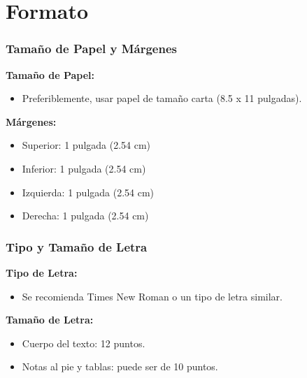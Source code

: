 \documentclass[
11pt, %
]{beamer}
\begin{document}
\section{Formato}

\begin{frame}
	\frametitle{Tamaño de Papel y Márgenes}

	\textbf{Tamaño de Papel:}
	\begin{itemize}
		\item Preferiblemente, usar papel de tamaño carta (8.5 x 11 pulgadas).
	\end{itemize}

	\textbf{Márgenes:}
	\begin{itemize}
		\item Superior: 1 pulgada (2.54 cm)
		\item Inferior: 1 pulgada (2.54 cm)
		\item Izquierda: 1 pulgada (2.54 cm)
		\item Derecha: 1 pulgada (2.54 cm)
	\end{itemize}
\end{frame}

\begin{frame}
	\frametitle{Tipo y Tamaño de Letra}

	\textbf{Tipo de Letra:}
	\begin{itemize}
		\item Se recomienda Times New Roman o un tipo de letra similar.
	\end{itemize}

	\textbf{Tamaño de Letra:}
	\begin{itemize}
		\item Cuerpo del texto: 12 puntos.
		\item Notas al pie y tablas: puede ser de 10 puntos.
	\end{itemize}
\end{frame}
\end{document}
